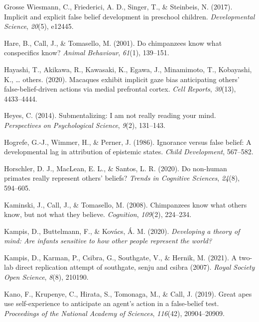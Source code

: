 \documentclass[
  english,
  man,floatsintext]{apa6}
\newlength{\cslhangindent}
\newlength{\cslentryspacingunit} %
\newenvironment{CSLReferences}[2] %
 {%
  \setlength{\parindent}{0pt}
  \ifodd #1
  \let\oldpar\par
  \def\par{\hangindent=\cslhangindent\oldpar}
  \fi
  \setlength{\parskip}{#2\cslentryspacingunit}
 }%
 {}
\begin{document}
\begin{CSLReferences}{1}{0}
\leavevmode{}%
Grosse Wiesmann, C., Friederici, A. D., Singer, T., \& Steinbeis, N. (2017). Implicit and explicit false belief development in preschool children. \emph{Developmental Science}, \emph{20}(5), e12445.

\leavevmode{}%
Hare, B., Call, J., \& Tomasello, M. (2001). Do chimpanzees know what conspecifics know? \emph{Animal Behaviour}, \emph{61}(1), 139--151.

\leavevmode{}%
Hayashi, T., Akikawa, R., Kawasaki, K., Egawa, J., Minamimoto, T., Kobayashi, K., \ldots{} others. (2020). Macaques exhibit implicit gaze bias anticipating others' false-belief-driven actions via medial prefrontal cortex. \emph{Cell Reports}, \emph{30}(13), 4433--4444.

\leavevmode{}%
Heyes, C. (2014). Submentalizing: I am not really reading your mind. \emph{Perspectives on Psychological Science}, \emph{9}(2), 131--143.

\leavevmode{}%
Hogrefe, G.-J., Wimmer, H., \& Perner, J. (1986). Ignorance versus false belief: A developmental lag in attribution of epistemic states. \emph{Child Development}, 567--582.

\leavevmode{}%
Horschler, D. J., MacLean, E. L., \& Santos, L. R. (2020). Do non-human primates really represent others' beliefs? \emph{Trends in Cognitive Sciences}, \emph{24}(8), 594--605.

\leavevmode{}%
Kaminski, J., Call, J., \& Tomasello, M. (2008). Chimpanzees know what others know, but not what they believe. \emph{Cognition}, \emph{109}(2), 224--234.

\leavevmode{}%
Kampis, D., Buttelmann, F., \& Kovács, Á. M. (2020). \emph{Developing a theory of mind: Are infants sensitive to how other people represent the world?}

\leavevmode{}%
Kampis, D., Karman, P., Csibra, G., Southgate, V., \& Hernik, M. (2021). A two-lab direct replication attempt of southgate, senju and csibra (2007). \emph{Royal Society Open Science}, \emph{8}(8), 210190.

\leavevmode{}%
Kano, F., Krupenye, C., Hirata, S., Tomonaga, M., \& Call, J. (2019). Great apes use self-experience to anticipate an agent's action in a false-belief test. \emph{Proceedings of the National Academy of Sciences}, \emph{116}(42), 20904--20909.


\end{CSLReferences}
\end{document}
